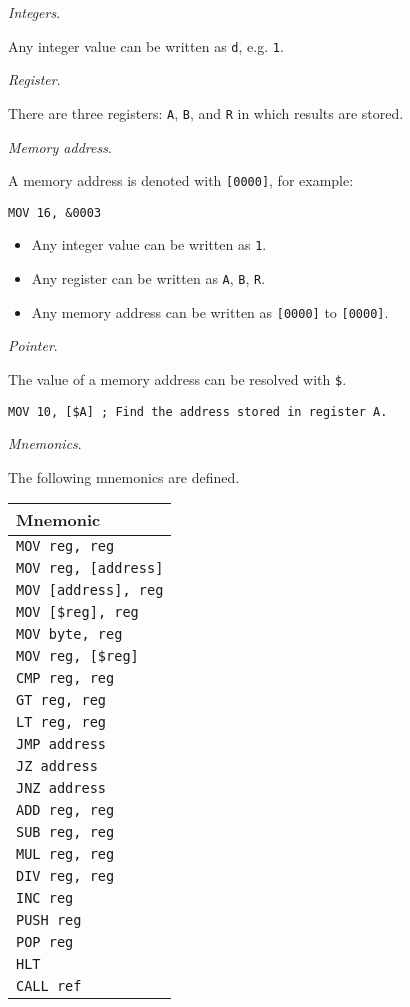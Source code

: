 \documentclass[11pt]{article}
\providecommand{\tightlist}{%
      \setlength{\itemsep}{0pt}\setlength{\parskip}{0pt}}
\begin{document}
    \emph{Integers}.

Any integer value can be written as \texttt{d}, e.g. \texttt{1}.

\emph{Register}.

There are three registers: \texttt{A}, \texttt{B}, and \texttt{R} in
which results are stored.

\emph{Memory address}.

A memory address is denoted with \texttt{{[}0000{]}}, for example:

\begin{verbatim}
MOV 16, &0003
\end{verbatim}

\begin{itemize}
\tightlist
\item
  Any integer value can be written as \texttt{1}.
\item
  Any register can be written as \texttt{A}, \texttt{B}, \texttt{R}.
\item
  Any memory address can be written as \texttt{{[}0000{]}} to
  \texttt{{[}0000{]}}.
\end{itemize}

\emph{Pointer}.

The value of a memory address can be resolved with \texttt{\$}.

\begin{verbatim}
MOV 10, [$A] ; Find the address stored in register A.
\end{verbatim}

\emph{Mnemonics}.

The following mnemonics are defined.

    \begin{longtable}[]{@{}l@{}}
\toprule
Mnemonic\tabularnewline
\midrule
\endhead
\texttt{MOV\ reg,\ reg}\tabularnewline
\texttt{MOV\ reg,\ {[}address{]}}\tabularnewline
\texttt{MOV\ {[}address{]},\ reg}\tabularnewline
\texttt{MOV\ {[}\$reg{]},\ reg}\tabularnewline
\texttt{MOV\ byte,\ reg}\tabularnewline
\texttt{MOV\ reg,\ {[}\$reg{]}}\tabularnewline
\texttt{CMP\ reg,\ reg}\tabularnewline
\texttt{GT\ reg,\ reg}\tabularnewline
\texttt{LT\ reg,\ reg}\tabularnewline
\texttt{JMP\ address}\tabularnewline
\texttt{JZ\ address}\tabularnewline
\texttt{JNZ\ address}\tabularnewline
\texttt{ADD\ reg,\ reg}\tabularnewline
\texttt{SUB\ reg,\ reg}\tabularnewline
\texttt{MUL\ reg,\ reg}\tabularnewline
\texttt{DIV\ reg,\ reg}\tabularnewline
\texttt{INC\ reg}\tabularnewline
\texttt{PUSH\ reg}\tabularnewline
\texttt{POP\ reg}\tabularnewline
\texttt{HLT}\tabularnewline
\texttt{CALL\ ref}\tabularnewline
\bottomrule
\end{longtable}
\end{document}
